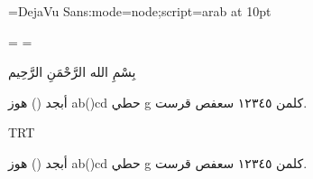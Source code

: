 


\font\aaa={DejaVu Sans:mode=node;script=arab} at 10pt\aaa

\showboxdepth=\maxdimen
\showboxbreadth=\maxdimen



\centerline{بِسْمِ الله الرَّحْمَنِ الرَّحِيم}

أبجد () هوز ab()cd حطي g كلمن ١٢٣٤٥ سعفص قرست.

\pardir TRT

أبجد () هوز ab()cd حطي g كلمن ١٢٣٤٥ سعفص قرست.
\bye
